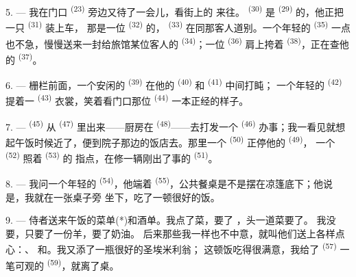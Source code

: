 5. --- 我在门口 \textsuperscript{(23)} 旁边又待了一会儿，看街上的
来往。 \textsuperscript{(30)} 是
\textsuperscript{(29)} 的，他正把一只 \textsuperscript{(31)} 装上车，
那是一位 \textsuperscript{(32)} 的， \textsuperscript{(33)} 在同那客人道别。一个年轻的
 \textsuperscript{(35)} 一点也不急，慢慢送来一封给旅馆某位客人的
 \textsuperscript{(34)}；一位 \textsuperscript{(36)} 肩上挎着
 \textsuperscript{(38)}，正在查他的 \textsuperscript{(37)}。

\VUsaut{4.0mm}
\VUsaut{3.0mm}

6. --- 栅栏前面，一个安闲的 \textsuperscript{(39)} 在他的
 \textsuperscript{(40)} 和 \textsuperscript{(41)} 中间打盹；
一个年轻的 \textsuperscript{(42)} 提着一 \textsuperscript{(43)}
衣裳，笑着看门口那位 \textsuperscript{(44)} 一本正经的样子。

7. ---  \textsuperscript{(45)} 从 \textsuperscript{(47)}
里出来——厨房在 \textsuperscript{(48)}——去打发一个
 \textsuperscript{(46)} 办事；我一看见就想起午饭时候近了，便到院子那边的饭店去。那里一个
 \textsuperscript{(50)} 正停他的 \textsuperscript{(49)}，
一个 \textsuperscript{(52)} 照着 \textsuperscript{(53)} 的
指点，在修一辆刚出了事的 \textsuperscript{(51)}。

8. --- 我问一个年轻的 \textsuperscript{(54)}，他端着
 \textsuperscript{(55)}，公共餐桌是不是摆在凉篷底下；他说是，我就在一张桌子旁
坐下，吃了一顿很好的饭。


\VUsaut{4.0mm}
\VUsaut{3.0mm}

9. --- 侍者送来午饭的菜单(*)和酒单。我点了菜，要了
，头一道菜要了。
我没要，只要了一份羊，要了奶油。
后来那些我一样也不中意，就叫他们送上各样点心：、
和。我又添了一瓶很好的圣埃米利翁；
这顿饭吃得很满意，我给了 \textsuperscript{(57)} 一笔可观的
 \textsuperscript{(59)}，就离了桌。

